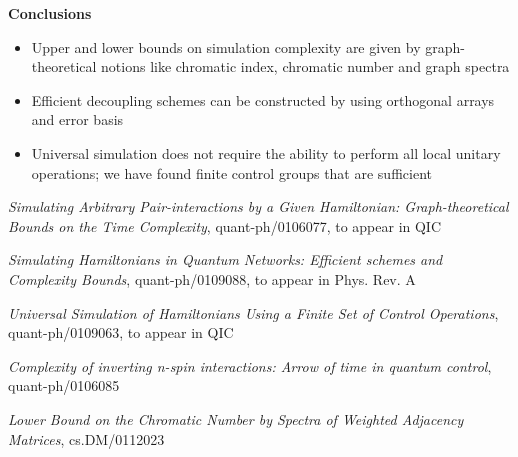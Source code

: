 \documentclass[portrait]{seminar}
\begin{document}
\begin{slide}
{\bf {\large Conclusions}}
\begin{itemize}
\item Upper and lower bounds on simulation complexity are given by
graph-theoretical notions like chromatic index, chromatic number and
graph spectra
\item Efficient decoupling schemes can be constructed by using 
orthogonal arrays and error basis
\item Universal simulation does not require the ability to perform all
local unitary operations; we have found finite control groups that are
sufficient
\end{itemize}
{\tiny
{\it Simulating Arbitrary Pair-interactions by a Given Hamiltonian: 
Graph-theoretical Bounds on the Time Complexity},
quant-ph/0106077, to appear in QIC

{\it Simulating Hamiltonians in Quantum Networks: Efficient schemes and
Complexity Bounds}, quant-ph/0109088, to appear in Phys. Rev. A

{\it Universal Simulation of Hamiltonians Using a Finite Set of Control 
Operations}, quant-ph/0109063, to appear in QIC

{\it Complexity of inverting n-spin interactions: Arrow of time in quantum 
control}, quant-ph/0106085

{\it Lower Bound on the Chromatic Number by Spectra of Weighted Adjacency 
Matrices}, cs.DM/0112023
}
\end{slide}
\end{document}
